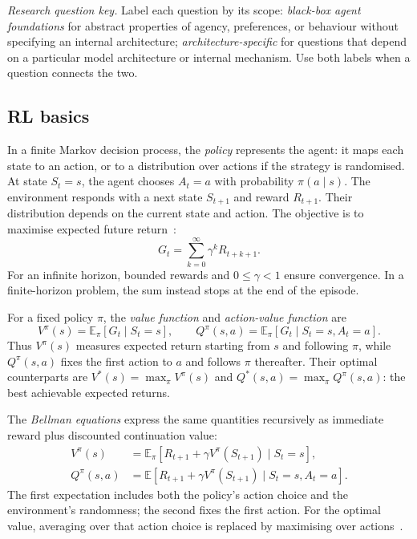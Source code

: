 \noindent\textit{Research question key.} Label each question by its scope: \emph{black-box agent foundations} for abstract properties of agency, preferences, or behaviour without specifying an internal architecture; \emph{architecture-specific} for questions that depend on a particular model architecture or internal mechanism. Use both labels when a question connects the two.

\subsection{RL basics}

In a finite Markov decision process, the \emph{policy} represents the agent: it maps each state to an action, or to a distribution over actions if the strategy is randomised. At state $S_t=s$, the agent chooses $A_t=a$ with probability $\pi(a\mid s)$. The environment responds with a next state $S_{t+1}$ and reward $R_{t+1}$. Their distribution depends on the current state and action. The objective is to maximise expected future return~\cite{rosas2026rl}:
\[
  G_t=\sum_{k=0}^{\infty}\gamma^k R_{t+k+1}.
\]
For an infinite horizon, bounded rewards and $0\leq\gamma<1$ ensure convergence. In a finite-horizon problem, the sum instead stops at the end of the episode.

For a fixed policy $\pi$, the \emph{value function} and \emph{action-value function} are
\[
  V^\pi(s)=\mathbb E_\pi[G_t\mid S_t=s],
  \qquad
  Q^\pi(s,a)=\mathbb E_\pi[G_t\mid S_t=s,A_t=a].
\]
Thus $V^\pi(s)$ measures expected return starting from $s$ and following $\pi$, while $Q^\pi(s,a)$ fixes the first action to $a$ and follows $\pi$ thereafter. Their optimal counterparts are $V^*(s)=\max_\pi V^\pi(s)$ and $Q^*(s,a)=\max_\pi Q^\pi(s,a)$: the best achievable expected returns.

The \emph{Bellman equations} express the same quantities recursively as immediate reward plus discounted continuation value:
\[
  \begin{aligned}
    V^\pi(s)&=\mathbb E_\pi[R_{t+1}+\gamma V^\pi(S_{t+1})\mid S_t=s],\\
    Q^\pi(s,a)&=\mathbb E[R_{t+1}+\gamma V^\pi(S_{t+1})\mid S_t=s,A_t=a].
  \end{aligned}
\]
The first expectation includes both the policy's action choice and the environment's randomness; the second fixes the first action. For the optimal value, averaging over that action choice is replaced by maximising over actions~\cite{rosas2026rl}.

